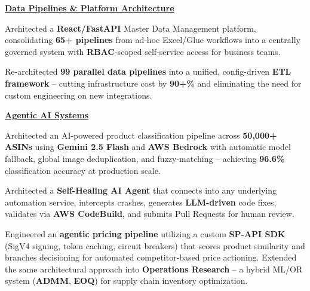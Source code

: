 \documentclass[letterpaper,10pt]{article}
\begin{document}
\begin{resume_list}
    \item[] \underline{\textbf{Data Pipelines \& Platform Architecture}}
    \item Architected a \textbf{React/FastAPI} Master Data Management platform, consolidating \textbf{65+ pipelines} from ad-hoc Excel/Glue workflows into a centrally governed system with \textbf{RBAC}-scoped self-service access for business teams.
    \item Re-architected \textbf{99 parallel data pipelines} into a unified, config-driven \textbf{ETL framework} -- cutting infrastructure cost by \textbf{90+\%} and eliminating the need for custom engineering on new integrations.

    \vspace{3pt}
    \item[] \underline{\textbf{Agentic AI Systems}}
    \item Architected an AI-powered product classification pipeline across \textbf{50,000+ ASINs} using \textbf{Gemini 2.5 Flash} and \textbf{AWS Bedrock} with automatic model fallback, global image deduplication, and fuzzy-matching -- achieving \textbf{96.6\%} classification accuracy at production scale.
    \item Architected a \textbf{Self-Healing AI Agent} that connects into any underlying automation service, intercepts crashes, generates \textbf{LLM-driven} code fixes, validates via \textbf{AWS CodeBuild}, and submits Pull Requests for human review.
    \item Engineered an \textbf{agentic pricing pipeline} utilizing a custom \textbf{SP-API SDK} (SigV4 signing, token caching, circuit breakers) that scores product similarity and branches decisioning for automated competitor-based price actioning. Extended the same architectural approach into \textbf{Operations Research} -- a hybrid ML/OR system (\textbf{ADMM}, \textbf{EOQ}) for supply chain inventory optimization.
\end{resume_list}
\end{document}
